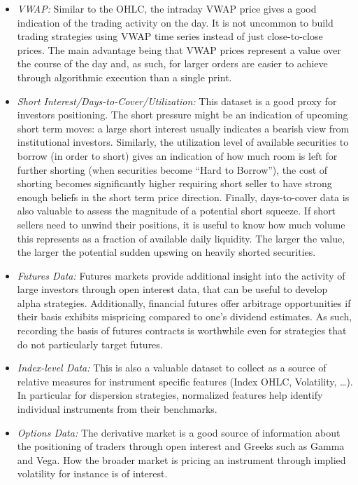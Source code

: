 \begin{itemize}
\item \emph{VWAP:} Similar to the OHLC, the intraday VWAP price gives a good indication of the trading activity on the day. It is not uncommon to build trading strategies using VWAP time series instead of just close-to-close prices. The main advantage being that VWAP prices represent a value over the course of the day and, as such, for larger orders are easier to achieve through algorithmic execution than a single print.


\item \emph{Short Interest/Days-to-Cover/Utilization:} This dataset is a good proxy for investors positioning. The short pressure might be an indication of upcoming short term moves: a large short interest usually indicates a bearish view from institutional investors. Similarly, the utilization level of available securities to borrow (in order to short) gives an indication of how much room is left for further shorting (when securities become ``Hard to Borrow''), the cost of shorting becomes significantly higher requiring short seller to have strong enough beliefs in the short term price direction. Finally, days-to-cover data is also valuable to assess the magnitude of a potential short squeeze. If short sellers need to unwind their positions, it is useful to know how much volume this represents as a fraction of available daily liquidity. The larger the value, the larger the potential sudden upswing on heavily shorted securities.


\item \emph{Futures Data:} Futures markets provide additional insight into the activity of large investors through open interest data, that can be useful to develop alpha strategies. Additionally, financial futures offer arbitrage opportunities if their basis exhibits mispricing compared to one's dividend estimates. As such, recording the basis of futures contracts is worthwhile even for strategies that do not particularly target futures.


\item \emph{Index-level Data:} This is also a valuable dataset to collect as a source of relative measures for instrument specific features (Index OHLC, Volatility, \dots). In particular for dispersion strategies, normalized features help identify individual instruments from their benchmarks. 


\item \emph{Options Data:} The derivative market is a good source of information about the positioning of traders through open interest and Greeks such as Gamma and Vega. How the broader market is pricing an instrument through implied volatility for instance is of interest.



\end{itemize}
